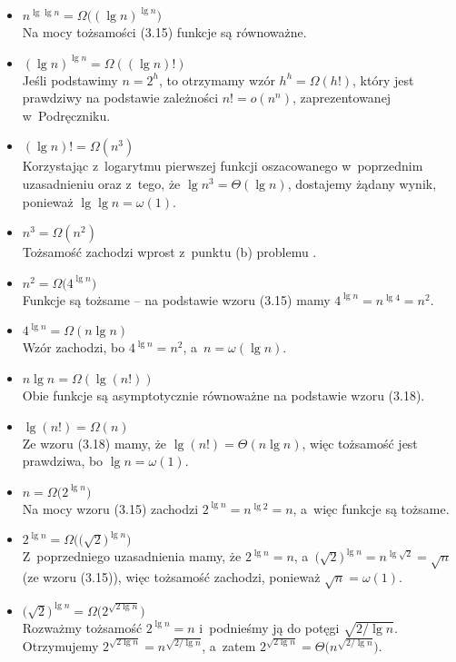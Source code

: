 \begin{itemize}
\item $n^{\lg\lg n}=\Omega\bigl((\lg n)^{\lg n}\bigr)$ \\
	Na mocy tożsamości (3.15) funkcje są równoważne.
\item $(\lg n)^{\lg n}=\Omega((\lg n)!)$ \\
	Jeśli podstawimy $n=2^h$, to otrzymamy wzór $h^h=\Omega(h!)$, który jest prawdziwy na podstawie zależności $n!=o(n^n)$, zaprezentowanej w~Podręczniku.
\item $(\lg n)!=\Omega(n^3)$ \\
	Korzystając z~logarytmu pierwszej funkcji oszacowanego w~poprzednim uzasadnieniu oraz z~tego, że $\lg n^3=\Theta(\lg n)$, dostajemy żądany wynik, ponieważ $\lg\lg n=\omega(1)$.
\item $n^3=\Omega(n^2)$ \\
	Tożsamość zachodzi wprost z~punktu (b) problemu .
\item $n^2=\Omega\bigl(4^{\lg n}\bigr)$ \\
	Funkcje są tożsame -- na podstawie wzoru (3.15) mamy $4^{\lg n}=n^{\lg4}=n^2$.
\item $4^{\lg n}=\Omega(n\lg n)$ \\
	Wzór zachodzi, bo $4^{\lg n}=n^2$, a~$n=\omega(\lg n)$.
\item $n\lg n=\Omega(\lg(n!))$ \\
	Obie funkcje są asymptotycznie równoważne na podstawie wzoru (3.18).
\item $\lg(n!)=\Omega(n)$ \\
	Ze wzoru (3.18) mamy, że $\lg(n!)=\Theta(n\lg n)$, więc tożsamość jest prawdziwa, bo $\lg n=\omega(1)$.
\item $n=\Omega\bigl(2^{\lg n}\bigr)$ \\
	Na mocy wzoru (3.15) zachodzi $2^{\lg n}=n^{\lg2}=n$, a~więc funkcje są tożsame.
\item $2^{\lg n}=\Omega\bigl(\!\bigl(\!\sqrt{2}\bigr)^{\lg n}\bigr)$ \\
	Z~poprzedniego uzasadnienia mamy, że $2^{\lg n}=n$, a~$\bigl(\!\sqrt{2}\bigr)^{\lg n}=n^{\lg\sqrt{2}}=\sqrt{n}$ (ze wzoru (3.15)), więc tożsamość zachodzi, ponieważ $\sqrt{n}=\omega(1)$.
\item $\bigl(\!\sqrt{2}\bigr)^{\lg n}=\Omega\bigl(2^{\sqrt{2\lg n}}\bigr)$ \\
	Rozważmy tożsamość $2^{\lg n}=n$ i~podnieśmy ją do potęgi $\sqrt{2/\!\lg n}$.
Otrzymujemy $2^{\sqrt{2\lg n}}=n^{\sqrt{2/\!\lg n}}$, a~zatem $2^{\sqrt{2\lg n}}=\Theta\bigl(n^{\sqrt{2/\!\lg n}}\bigr)$.

\end{itemize}
